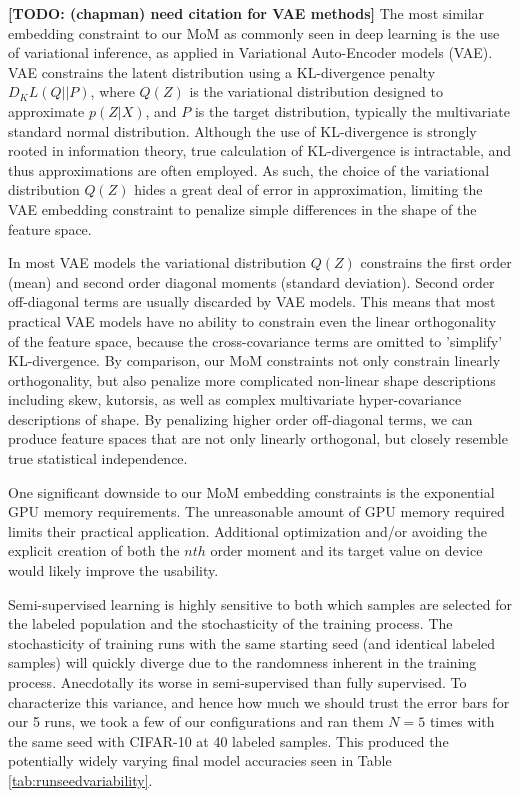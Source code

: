 \documentclass[10pt,twocolumn,letterpaper]{article}
\newcommand{\TODO}[1]{\textbf{\color{red}[TODO: #1]}}
\begin{document}
\TODO{(chapman) need citation for VAE methods}
The most similar embedding constraint to our MoM as commonly seen in deep learning is the use of variational inference, as applied in Variational Auto-Encoder models (VAE).
VAE constrains the latent distribution using a KL-divergence penalty $D_KL(Q||P)$, where $Q(Z)$ is the variational distribution designed to approximate $p(Z|X)$, and $P$ is the target distribution, typically the multivariate standard normal distribution. 
Although the use of KL-divergence is strongly rooted in information theory, true calculation of KL-divergence is intractable, and thus approximations are often employed. 
As such, the choice of the variational distribution $Q(Z)$ hides a great deal of error in approximation, limiting the VAE embedding constraint to penalize simple differences in the shape of the feature space.

In most VAE models the variational distribution $Q(Z)$ constrains the first order (mean) and second order diagonal moments (standard deviation).
Second order off-diagonal terms are usually discarded by VAE models.  
This means that most practical VAE models have no ability to constrain even the linear orthogonality of the feature space, because the cross-covariance terms are omitted to 'simplify' KL-divergence.  
By comparison, our MoM constraints not only constrain linearly orthogonality, but also penalize more complicated non-linear shape descriptions including skew, kutorsis, as well as complex multivariate hyper-covariance descriptions of shape.  
By penalizing higher order off-diagonal terms, we can produce feature spaces that are not only linearly orthogonal, but closely resemble true statistical independence.

One significant downside to our MoM embedding constraints is the exponential GPU memory requirements. 
The unreasonable amount of GPU memory required limits their practical application.
Additional optimization and/or avoiding the explicit creation of both the $nth$ order moment and its target value on device would likely improve the usability.

Semi-supervised learning is highly sensitive to both which samples are selected for the labeled population \cite{sohn2020fixmatch} and the stochasticity of the training process.
The stochasticity of training runs with the same starting seed (and identical labeled samples) will quickly diverge due to the randomness inherent in the training process.
Anecdotally its worse in semi-supervised than fully supervised.
To characterize this variance, and hence how much we should trust the error bars for our 5 runs, we took a few of our configurations and ran them $N=5$ times with the same seed with CIFAR-10 at 40 labeled samples.
This produced the potentially widely varying final model accuracies seen in Table \ref{tab:runseedvariability}.
\end{document}
